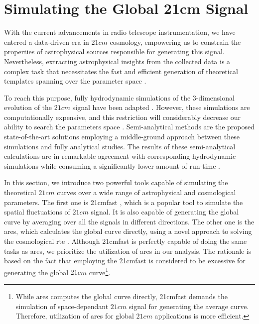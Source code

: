 \documentclass[12pt, TexShade, letterpaper]{report}
\begin{document}
\section{Simulating the Global 21cm Signal}
With the current advancements in radio telescope instrumentation, we have entered a data-driven era in $21cm$ cosmology, empowering us to constrain the properties of astrophysical sources responsible for generating this signal. Nevertheless, extracting astrophysical insights from the collected data is a complex task that necessitates the fast and efficient generation of theoretical templates spanning over the parameter space \cite{emulate_21cm}. \par
To reach this purpose, fully hydrodynamic simulations of the 3-dimensional evolution of the $21cm$ signal have been adapted \cite{hydrodynamic_sim}. However, these simulations are computationally expensive, and this restriction will considerably decrease our ability to search the parameters space \cite{ares2014jordan}. 
Semi-analytical methods are the proposed state-of-the-art solutions employing a middle-ground approach between these simulations and fully analytical studies. The results of these semi-analytical calculations are in remarkable agreement with corresponding hydrodynamic simulations while consuming a significantly lower amount of run-time \cite{semi_analytic_1, semi_analytic_2, semi_analytic_3, semi_analytic_4, semi-analytic_5}. \par
In this section, we introduce two powerful tools capable of simulating the theoretical $21cm$ curves over a wide range of astrophysical and cosmological parameters. The first one is \gls{21cmfast} \cite{21cmfast_c, 21cmfast_python}, which is a popular tool to simulate the spatial fluctuations of $21cm$ signal. It is also capable of generating the global curve by averaging over all the signals in different directions. The other one is the \gls{ares}, which calculates the global curve directly, using a novel approach to solving the cosmological \gls{rte} \cite{ares2014jordan}. Although \gls{21cmfast} is perfectly capable of doing the same tasks as \gls{ares}, we prioritize the utilization of \gls{ares} in our analysis. The rationale is based on the fact that employing the \gls{21cmfast} is considered to be excessive for generating the global $21cm$ curve\footnote{While \gls{ares} computes the global curve directly, \gls{21cmfast} demands the simulation of space-dependant $21cm$ signal for generating the average curve. Therefore, utilization of \gls{ares} for global $21cm$ applications is more efficient.}.\par
\end{document}
